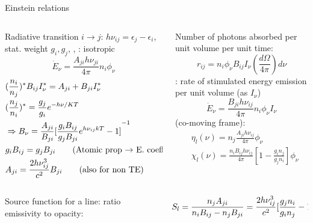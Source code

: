 \begin{frame}{Einstein relations}
    \begin{columns}[T]
        \begin{column}{0.5\textwidth}
            Radiative transition $i\to j$: $h\nu_{ij}=\epsilon_j-\epsilon_i$, stat. weight $g_i, g_j$, , : isotropic
                        \[\dot{E}_{\nu}=\frac{A_{ji}h\nu_{ji}}{4\pi}n_i\phi_{\nu}\]
                \begin{align*}
                &(\frac{n_i}{n_j})^*B_{ij}I_{\nu}^*=A_{ji}+B_{ji}I_{\nu}^*\label{CR and TE}\\
                                &(\frac{n_j}{n_i})^*=\frac{g_j}{g_i}e^{-h\nu/KT}\\
                            &\Rightarrow B_{\nu}=\frac{A_{ji}}{B_{ji}}{[\frac{g_iB_{ij}}{g_jB_{ji}}e^{h\nu_{ij}kT}-1]}^{-1}\\
                        &g_iB_{ij}=g_jB_{ji}\tag{Atomic prop $\to$ E. coeff}\\
                    &A_{ji}=\frac{2h\nu_{ij}^3}{c^2}B_{ji}\tag{also for non TE}
            \end{align*}
        \end{column}
        \begin{column}{0.5\textwidth}
            Number of photons absorbed per unit volume per unit time:
            \[r_{ij}=n_i\phi_{\nu}B_{ij}I_{\nu}(\frac{d\Omega}{4\pi})d\nu\]
            : rate of stimulated energy emission per unit volume (as $I_{\nu}$)
            \[\dot{E}_{\nu}=\frac{B_{ji}h\nu_{ij}}{4\pi}n_i\phi_{\nu}I_{\nu}\]
             (co-moving frame):
            \begin{align*}
    &\eta_l(\nu)=n_j\frac{A_{ji}h\nu_{ij}}{4\pi}\phi_{\nu}\\
    &\chi_l(\nu)=\frac{n_iB_{ij}h\nu_{ij}}{4\pi}[1-\frac{g_in_j}{g_jn_i}]\phi_{\nu}
            \end{align*}
        \end{column}
    \end{columns}
    \begin{columns}[T]
        \begin{column}{0.4\textwidth}
             Source function for a line: ratio emissivity to opacity:
        \end{column}
        \begin{column}{0.6\textwidth}
            \[S_l=\frac{n_jA_{ji}}{n_iB_{ij}-n_jB_{ji}}=\frac{2h\nu_{ij}^3}{c^2}{[\frac{g_jn_i}{g_in_j}-1]}^{-1}\to B_{\nu}\]
        \end{column}
    \end{columns}
\end{frame}

